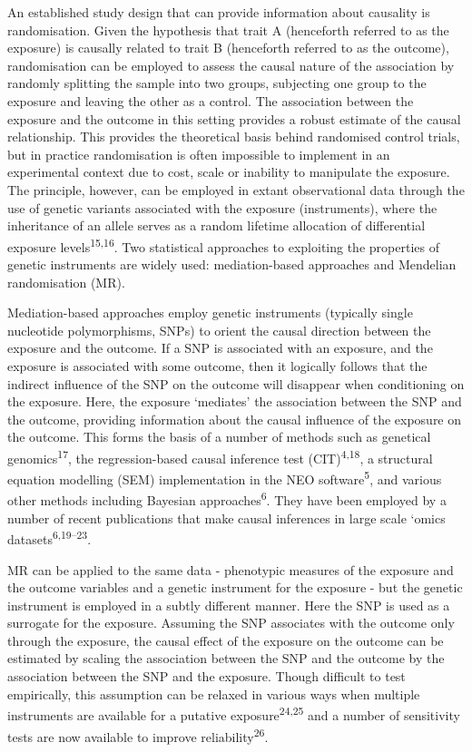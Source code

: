 \documentclass[]{article}
\begin{document}
An established study design that can provide information about causality
is randomisation. Given the hypothesis that trait A (henceforth referred
to as the exposure) is causally related to trait B (henceforth referred
to as the outcome), randomisation can be employed to assess the causal
nature of the association by randomly splitting the sample into two
groups, subjecting one group to the exposure and leaving the other as a
control. The association between the exposure and the outcome in this
setting provides a robust estimate of the causal relationship. This
provides the theoretical basis behind randomised control trials, but in
practice randomisation is often impossible to implement in an
experimental context due to cost, scale or inability to manipulate the
exposure. The principle, however, can be employed in extant
observational data through the use of genetic variants associated with
the exposure (instruments), where the inheritance of an allele serves as
a random lifetime allocation of differential exposure
levels\textsuperscript{15,16}. Two statistical approaches to exploiting
the properties of genetic instruments are widely used: mediation-based
approaches and Mendelian randomisation (MR).

Mediation-based approaches employ genetic instruments (typically single
nucleotide polymorphisms, SNPs) to orient the causal direction between
the exposure and the outcome. If a SNP is associated with an exposure,
and the exposure is associated with some outcome, then it logically
follows that the indirect influence of the SNP on the outcome will
disappear when conditioning on the exposure. Here, the exposure
`mediates' the association between the SNP and the outcome, providing
information about the causal influence of the exposure on the outcome.
This forms the basis of a number of methods such as genetical
genomics\textsuperscript{17}, the regression-based causal inference test
(CIT)\textsuperscript{4,18}, a structural equation modelling (SEM)
implementation in the NEO software\textsuperscript{5}, and various other
methods including Bayesian approaches\textsuperscript{6}. They have been
employed by a number of recent publications that make causal inferences
in large scale `omics datasets\textsuperscript{6,19--23}.

MR can be applied to the same data - phenotypic measures of the exposure
and the outcome variables and a genetic instrument for the exposure -
but the genetic instrument is employed in a subtly different manner.
Here the SNP is used as a surrogate for the exposure. Assuming the SNP
associates with the outcome only through the exposure, the causal effect
of the exposure on the outcome can be estimated by scaling the
association between the SNP and the outcome by the association between
the SNP and the exposure. Though difficult to test empirically, this
assumption can be relaxed in various ways when multiple instruments are
available for a putative exposure\textsuperscript{24,25} and a number of
sensitivity tests are now available to improve
reliability\textsuperscript{26}.
\end{document}
